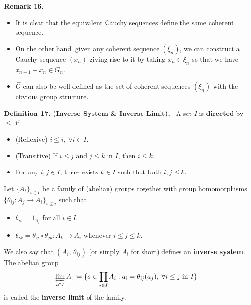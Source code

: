 \documentclass[12pt,a4paper,footinclude=true,headinclude=true]{scrbook} %
\newenvironment{definition}[2][Definition]
    { \begin{mdframed}[backgroundcolor=gray!20] \textbf{#1 #2.}\ }
    {  \end{mdframed}}
\newenvironment{remark}[2][Remark]
    { \begin{mdframed}[backgroundcolor=gray!20] \textbf{#1 #2.} }
    {  \end{mdframed}}
\begin{document}
\begin{remark}{16}
    \begin{itemize}
        \item It is clear that the equivalent Cauchy sequences define the same coherent sequence.
        \item On the other hand, given any coherent sequence $(\xi_n)$, we can construct a Cauchy sequence $(x_n)$ giving rise to it by taking $x_n\in\xi_n$ so that we have $x_{n+1}-x_n\in G_n$.
        \item $\widehat{G}$ can also be well-defined as the set of coherent sequences $(\xi_n)$ with the obvious group structure.
    \end{itemize}
\end{remark}

\begin{definition}{17. (Inverse System \& Inverse Limit)}
    \newline A set $I$ is \textbf{directed} by $\leq$ if 
    \begin{itemize}
        \item (Reflexive) $i\leq i,\ \forall i\in I$.
        \item (Transitive) If $i\leq j$ and $j\leq k$ in $I$, then $i\leq k$.
        \item For any $i,j\in I$, there exists $k\in I$ such that both $i,j\leq k$.
    \end{itemize}
    Let $\{A_i\}_{i\in I}$ be a family of (abelian) groups together with group homomorphisms $\{\theta_{ij}:A_j\to A_i\}_{i\leq j}$ such that
    \begin{itemize}
        \item $\theta_{ii}=1_{A_i}$ for all $i\in I$.
        \item $\theta_{ik}=\theta_{ij}\circ\theta_{jk}:A_k\to A_i$ whenever $i\leq j\leq k$.
    \end{itemize}
    We also say that $(A_i,\ \theta_{ij})$ (or simply $A_i$ for short) defines an \textbf{inverse system}. The abelian group
    \begin{align*}
        \varprojlim_{i\in I}A_i\coloneqq\{a\in\prod_{i\in I}A_i:a_i=\theta_{ij}(a_j),\ \forall i\leq j\ \text{in}\ I\}
    \end{align*}
    is called the \textbf{inverse limit} of the family.
\end{definition}
\end{document}
